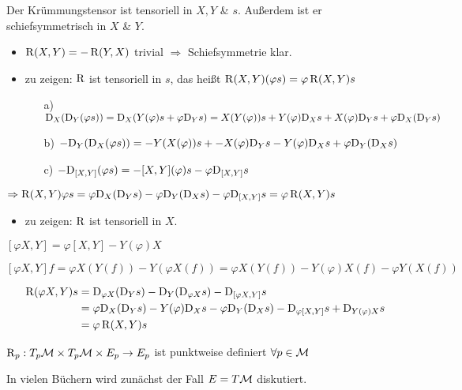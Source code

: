 \begin{satz}
Der Krümmungstensor ist tensoriell in $X, Y$ \& $s$. Außerdem ist er schiefsymmetrisch in $X$ \& $Y$. 
\begin{bew}
\begin{itemize}
\item $\operatorname{R}(X,Y) = -\operatorname{R}(Y,X)$ trivial $\Rightarrow$ Schiefsymmetrie klar.
\item zu zeigen: $\operatorname{R}$ ist tensoriell in $s$, das heißt $\operatorname{R}(X,Y)(\varphi s) = \varphi \operatorname{R}(X,Y)s$
	\begin{itemize}
		\item[a)] $\mathrm{D}_X(\mathrm{D}_Y(\varphi s)) = \mathrm{D}_X(Y(\varphi)s + \varphi\mathrm{D}_Ys) = X(Y(\varphi))s + Y(\varphi)\mathrm{D}_Xs + X(\varphi)\mathrm{D}_Ys  + \varphi\mathrm{D}_X(\mathrm{D}_Ys)$
		\item[b)] $-\mathrm{D}_Y(\mathrm{D}_X(\varphi s)) = -Y(X(\varphi))s + -X(\varphi)\mathrm{D}_Ys - Y(\varphi)\mathrm{D}_Xs  + \varphi\mathrm{D}_Y(\mathrm{D}_Xs)$
		\item [c)] $-\mathrm{D}_{[X,Y]}(\varphi s) = -[X,Y](\varphi)s - \varphi\mathrm{D}_{[X,Y]}s$
	\end{itemize}
\end{itemize}
\vspace{.5cm}
$\Rightarrow \operatorname{R}(X,Y) \varphi s = \varphi \mathrm{D}_X(\mathrm{D}_Ys) - \varphi \mathrm{D}_Y(\mathrm{D}_Xs) - \varphi \mathrm{D}_{[X,Y]}s 
= \varphi \operatorname{R}(X,Y)s $
\end{bew}
\begin{itemize}
\item  zu zeigen: $\operatorname{R}$ ist tensoriell in $X$.
\end{itemize}
\begin{hlem}
$[\varphi X,Y] = \varphi[X,Y] - Y(\varphi) X$
\begin{bew}
$[\varphi X,Y]f = \varphi X(Y(f)) - Y(\varphi X(f)) = \varphi X(Y(f)) - Y(\varphi) X(f) - \varphi Y(X(f))$
\end{bew}
\end{hlem}
\begin{bew}
\begin{align*}
\operatorname{R}(\varphi X, Y) s &= \mathrm{D}_{\varphi X} (\mathrm{D}_Ys) - \mathrm{D}_Y(\mathrm{D}_{\varphi X} s) - \mathrm{D}_{[\varphi X,Y]}s \\
&= \varphi \mathrm{D}_X (\mathrm{D}_Ys) - Y(\varphi) \mathrm{D}_Xs - \varphi \mathrm{D}_Y(\mathrm{D}_Xs) - \mathrm{D}_{\varphi [X,Y]}s + \mathrm{D}_{Y(\varphi)X}s \\
&= \varphi \operatorname{R}(X,Y)s
\end{align*}
\end{bew}
\end{satz}
\begin{kor}
$\operatorname{R}_p: T_p\mathcal{M} \times T_p\mathcal{M} \times E_p  \rightarrow E_p$ ist punktweise definiert $\forall p \in \mathcal{M}$
\end{kor}
\begin{bem}
In vielen Büchern wird zunächst der Fall $E = T\mathcal{M}$ diskutiert.
\end{bem}

